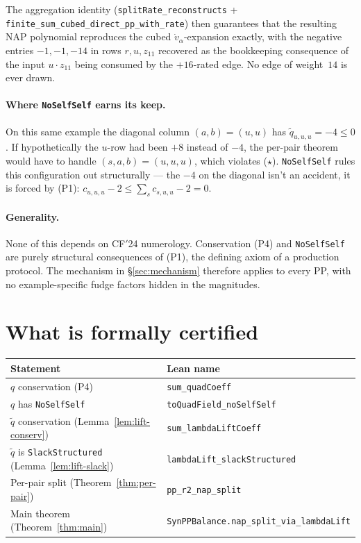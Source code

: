 \documentclass[11pt]{article}
\begin{document}
The aggregation identity (\texttt{splitRate\_reconstructs} +
\texttt{finite\_sum\_cubed\_direct\_pp\_with\_rate}) then guarantees
that the resulting NAP polynomial reproduces the cubed
$\dot v_\alpha$-expansion exactly, with the negative entries
$-1, -1, -14$ in rows $r, u, z_{11}$ recovered as the bookkeeping
consequence of the input $u \cdot z_{11}$ being consumed by the
$+16$-rated edge. No edge of weight~$14$ is ever drawn.

\paragraph{Where \texttt{NoSelfSelf} earns its keep.}
On this same example the diagonal column $(a, b) = (u, u)$ has
$\widetilde q_{u, u, u} = -4 \le 0$. If hypothetically the $u$-row had
been $+8$ instead of $-4$, the per-pair theorem would have to handle
$(s, a, b) = (u, u, u)$, which violates ($\star$). \verb|NoSelfSelf|
rules this configuration out structurally — the $-4$ on the diagonal
isn't an accident, it is forced by (P1):
$c_{u, u, u} - 2 \le \sum_s c_{s, u, u} - 2 = 0$.

\paragraph{Generality.}
None of this depends on CF$'$24 numerology. Conservation (P4) and
\verb|NoSelfSelf| are purely structural consequences of (P1), the
defining axiom of a production protocol. The mechanism in
\S\ref{sec:mechanism} therefore applies to every PP, with no
example-specific fudge factors hidden in the magnitudes.

\section{What is formally certified}

\begin{center}
\begin{tabular}{l l}
\textbf{Statement} & \textbf{Lean name} \\ \hline
$q$ conservation (P4) & \texttt{sum\_quadCoeff} \\
$q$ has \verb|NoSelfSelf| & \texttt{toQuadField\_noSelfSelf} \\
$\widetilde q$ conservation (Lemma~\ref{lem:lift-conserv}) & \texttt{sum\_lambdaLiftCoeff} \\
$\widetilde q$ is \verb|SlackStructured| (Lemma~\ref{lem:lift-slack}) & \texttt{lambdaLift\_slackStructured} \\
Per-pair split (Theorem~\ref{thm:per-pair}) & \texttt{pp\_r2\_nap\_split} \\
Main theorem (Theorem~\ref{thm:main}) & \texttt{SynPPBalance.nap\_split\_via\_lambdaLift} \\
\end{tabular}
\end{center}
\end{document}
